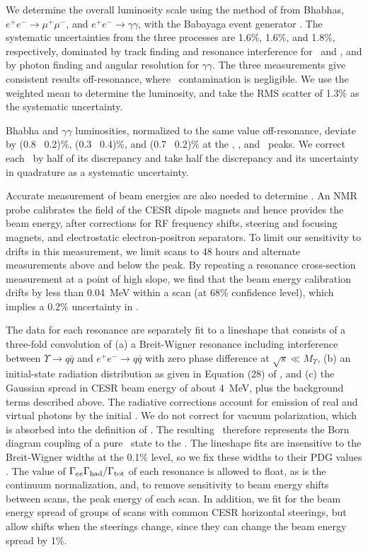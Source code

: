 \documentclass[aps,prd,preprint,superscriptaddress,tightenlines,nofootinbib]{revtex4}
\begin{document}
We determine the overall luminosity scale using the method of
\cite{oldlumi} from Bhabhas, $e^+e^- \to \mu^+\mu^-$, and $e^+e^- \to
\gamma\gamma$, with the {\textsc Babayaga} event generator
\cite{babayaga}.  The systematic uncertainties from the three
processes are 1.6\%, 1.6\%, and 1.8\%, respectively, dominated by
track finding and resonance interference for \ee\ and \mm, and by
photon finding and angular resolution for $\gamma\gamma$.  The three
measurements give consistent results off-resonance, where \ups\
contamination is negligible.  We use the weighted mean to determine
the luminosity, and take the RMS scatter of 1.3\% as the systematic
uncertainty.

Bhabha and $\gamma\gamma$ luminosities, normalized to the same value
off-resonance, deviate by (0.8 \PM\ 0.2)\%, (0.3 \PM\ 0.4)\%, and (0.7
\PM\ 0.2)\% at the \us, \uss, and \usss\ peaks.  We correct each \gee\
by half of its discrepancy and take half the discrepancy and its
uncertainty in quadrature as a systematic uncertainty.

Accurate measurement of beam energies are also needed to determine
\gee.  An NMR probe calibrates the field of the CESR dipole magnets
and hence provides the beam energy, after corrections for RF frequency
shifts, steering and focusing magnets, and electrostatic
electron-positron separators.  To limit our sensitivity to drifts in
this measurement, we limit scans to 48 hours and alternate
measurements above and below the peak.  By repeating a resonance
cross-section measurement at a point of high slope, we find that the
beam energy calibration drifts by less than 0.04~MeV within a scan (at
68\% confidence level), which implies a 0.2\% uncertainty in \gee.

The data for each resonance are separately fit to a lineshape that
consists of a three-fold convolution of (a) a Breit-Wigner resonance
including interference between $\Upsilon \to q\bar{q}$ and $e^+e^- \to
q\bar{q}$ with zero phase difference at $\sqrt{s} \ll M_\Upsilon$, (b)
an initial-state radiation distribution as given in Equation (28) of
\cite{kf}, and (c) the Gaussian spread in CESR beam energy of about
4~MeV, plus the background terms described above.  The radiative
corrections account for emission of real and virtual photons by the
initial \ee.  We do not correct for vacuum polarization, which is
absorbed into the definition of \gee.  The resulting \gee\ therefore
represents the Born diagram coupling of a pure \ee\ state to the \ups.
The lineshape fits are insensitive to the Breit-Wigner widths at the
0.1\% level, so we fix these widths to their PDG values \cite{pdg}.
The value of $\Gamma_{ee}\Gamma_{\mbox{\scriptsize had}}/\Gamma_{\mbox{\scriptsize tot}}$ of each resonance is allowed to float, as is
the continuum normalization, and, to remove sensitivity to beam energy
shifts between scans, the peak energy of each scan.  In addition, we
fit for the beam energy spread of groups of scans with common CESR
horizontal steerings, but allow shifts when the steerings change,
since they can change the beam energy spread by 1\%.
\end{document}
